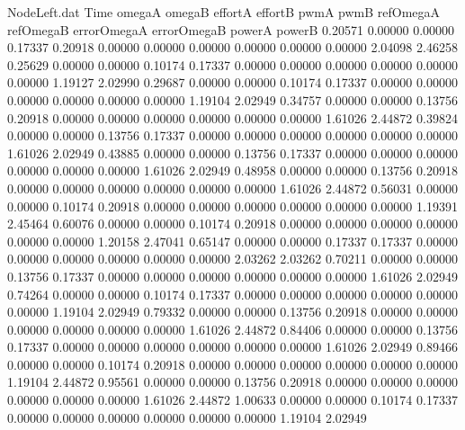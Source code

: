 \begin{filecontents}{NodeLeft.dat}
Time omegaA omegaB effortA effortB pwmA pwmB refOmegaA refOmegaB errorOmegaA errorOmegaB powerA powerB
   0.20571    0.00000    0.00000     0.17337    0.20918    0.00000    0.00000    0.00000    0.00000    0.00000    0.00000    2.04098    2.46258
   0.25629    0.00000    0.00000     0.10174    0.17337    0.00000    0.00000    0.00000    0.00000    0.00000    0.00000    1.19127    2.02990
   0.29687    0.00000    0.00000     0.10174    0.17337    0.00000    0.00000    0.00000    0.00000    0.00000    0.00000    1.19104    2.02949
   0.34757    0.00000    0.00000     0.13756    0.20918    0.00000    0.00000    0.00000    0.00000    0.00000    0.00000    1.61026    2.44872
   0.39824    0.00000    0.00000     0.13756    0.17337    0.00000    0.00000    0.00000    0.00000    0.00000    0.00000    1.61026    2.02949
   0.43885    0.00000    0.00000     0.13756    0.17337    0.00000    0.00000    0.00000    0.00000    0.00000    0.00000    1.61026    2.02949
   0.48958    0.00000    0.00000     0.13756    0.20918    0.00000    0.00000    0.00000    0.00000    0.00000    0.00000    1.61026    2.44872
   0.56031    0.00000    0.00000     0.10174    0.20918    0.00000    0.00000    0.00000    0.00000    0.00000    0.00000    1.19391    2.45464
   0.60076    0.00000    0.00000     0.10174    0.20918    0.00000    0.00000    0.00000    0.00000    0.00000    0.00000    1.20158    2.47041
   0.65147    0.00000    0.00000     0.17337    0.17337    0.00000    0.00000    0.00000    0.00000    0.00000    0.00000    2.03262    2.03262
   0.70211    0.00000    0.00000     0.13756    0.17337    0.00000    0.00000    0.00000    0.00000    0.00000    0.00000    1.61026    2.02949
   0.74264    0.00000    0.00000     0.10174    0.17337    0.00000    0.00000    0.00000    0.00000    0.00000    0.00000    1.19104    2.02949
   0.79332    0.00000    0.00000     0.13756    0.20918    0.00000    0.00000    0.00000    0.00000    0.00000    0.00000    1.61026    2.44872
   0.84406    0.00000    0.00000     0.13756    0.17337    0.00000    0.00000    0.00000    0.00000    0.00000    0.00000    1.61026    2.02949
   0.89466    0.00000    0.00000     0.10174    0.20918    0.00000    0.00000    0.00000    0.00000    0.00000    0.00000    1.19104    2.44872
   0.95561    0.00000    0.00000     0.13756    0.20918    0.00000    0.00000    0.00000    0.00000    0.00000    0.00000    1.61026    2.44872
   1.00633    0.00000    0.00000     0.10174    0.17337    0.00000    0.00000    0.00000    0.00000    0.00000    0.00000    1.19104    2.02949

\end{filecontents}

